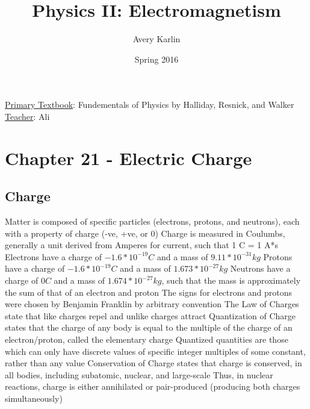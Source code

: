 \documentclass[11 pt, twoside]{article}
\newenvironment{outline*}
{
	\begin{outline}[enumerate]
	}
	{\end{outline}
}
\begin{document}
\title{Physics II: Electromagnetism}
\author{Avery Karlin}
\date{Spring 2016}
\newcommand{\textbook}{Fundementals of Physics by Halliday, Resnick, and Walker}
\newcommand{\teacher}{Ali}

\maketitle
\newpage
\hypertarget{content}{\tableofcontents}
\vspace{11pt}
\noindent
\underline{Primary Textbook}: \textbook\\
\underline{Teacher}: \teacher
\newpage

\section{Chapter 21 - Electric Charge}
\subsection{Charge}
\begin{outline*}
\1 Matter is composed of specific particles (electrons, protons, and neutrons), each with a property of charge (-ve, +ve, or 0)
\2 Charge is measured in Coulumbs, generally a unit derived from Amperes for current, such that 1 C = 1 A*s
\2 Electrons have a charge of $-1.6*10^{-19} C$ and a mass of $9.11*10^{-31} kg$
\2 Protons have a charge of $-1.6*10^{-19} C$ and a mass of $1.673*10^{-27} kg$
\2 Neutrons have a charge of $0 C$ and a mass of $1.674*10^{-27} kg$, such that the mass is approximately the sum of that of an electron and proton
\2 The signs for electrons and protons were chosen by Benjamin Franklin by arbitrary convention
\1 The Law of Charges state that like charges repel and unlike charges attract
\1 Quantization of Charge states that the charge of any body is equal to the multiple of the charge of an electron/proton, called the elementary charge
\2 Quantized quantities are those which can only have discrete values of specific integer multiples of some constant, rather than any value
\1 Conservation of Charge states that charge is conserved, in all bodies, including subatomic, nuclear, and large-scale
\2 Thus, in nuclear reactions, charge is either annihilated or pair-produced (producing both charges simultaneously)
\end{outline*}
\end{document}
